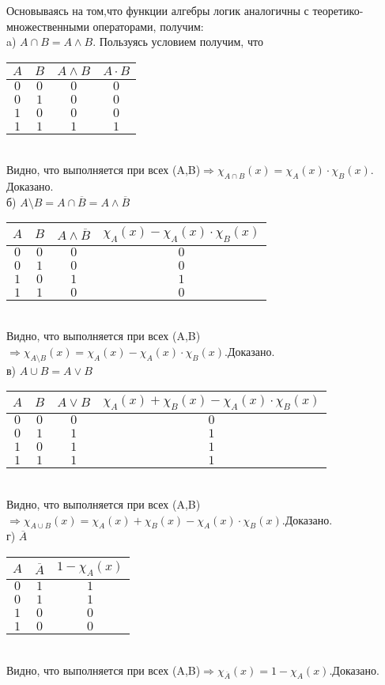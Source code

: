 \documentclass[a4paper,14pt]{article} %
\begin{document}
Основываясь на том,что функции алгебры логик аналогичны с теоретико-множественными операторами, получим:\\
a) $A \cap B = A \wedge B.$ Пользуясь условием получим, что\\
\begin{tabular}{ | c | c | c | c |}
\hline
$A$ & $B$ & $A\wedge B$ & $A \cdot B$\\ \hline
$0$ & $0$ & $0$ & $0$\\
$0$ & $1$ & $0$ & $0$\\
$1$ & $0$ & $0$ & $0$\\
$1$ & $1$ & $1$ & $1$\\
\hline 
\end{tabular}\\
Видно, что выполняется при всех (A,B)$ \Rightarrow \chi_{A\cap B}(x) = \chi_{A}(x) \cdot \chi_{B}(x)$. Доказано.\\
б) $A \setminus B = A \cap \overline{B} = A \wedge \overline{B}$\\
\begin{tabular}{ | c | c | c | c |}
\hline
$A$ & $B$ & $ A \wedge \overline{B}$ & $\chi_{A}(x) - \chi_{A}(x) \cdot \chi_{B}(x)$\\ \hline
$0$ & $0$ & $0$ & $0$\\
$0$ & $1$ & $0$ & $0$\\
$1$ & $0$ & $1$ & $1$\\
$1$ & $1$ & $0$ & $0$\\
\hline 
\end{tabular}\\
Видно, что выполняется при всех (A,B)$ \Rightarrow \chi_{A\setminus B}(x) = \chi_{A}(x) - \chi_{A}(x) \cdot \chi_{B}(x).$Доказано.\\
в) $A \cup B = A \vee B$\\
\begin{tabular}{ | c | c | c | c |}
\hline
$A$ & $B$ & $A \vee B$ & $\chi_A(x) + \chi_{B}(x) - \chi_{A}(x)\cdot \chi_{B} (x)$\\ \hline
$0$ & $0$ & $0$ & $0$\\
$0$ & $1$ & $1$ & $1$\\
$1$ & $0$ & $1$ & $1$\\
$1$ & $1$ & $1$ & $1$\\
\hline 
\end{tabular}\\
Видно, что выполняется при всех (A,B)$ \Rightarrow \chi_{A\cup B}(x) = \chi_A(x) + \chi_{B}(x) - \chi_{A}(x)\cdot \chi_{B} (x).$Доказано.\\
г) $\overline{A}$\\
\begin{tabular}{ | c | c | c |}
\hline
$A$ & $\overline{A}$ & $1 - \chi_{A}(x)$\\ \hline
$0$ & $1$ & $1$\\
$0$ & $1$ & $1$\\
$1$ & $0$ & $0$\\
$1$ & $0$ & $0$\\
\hline 
\end{tabular}\\
Видно, что выполняется при всех (A,B)$ \Rightarrow \chi_{\overline{A}}(x) = 1 - \chi_{A}(x).$Доказано.
\end{document}
